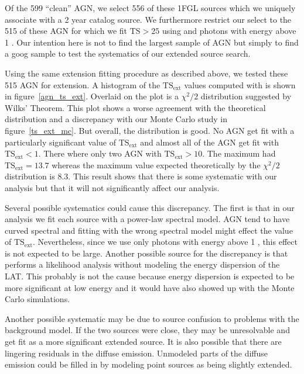 \documentclass[12pt,preprint]{aastex}
\newcommand{\gev}{\text{GeV}\xspace}
\newcommand{\tsext}{{\ensuremath{\text{TS}_\text{ext}}}\xspace}
\newcommand{\ts}{\text{TS}\xspace}
\newcommand{\pointlike}{\text{\em pointlike}\xspace}
\begin{document}
Of the 599 ``clean'' AGN, we select 556 of these 1FGL sources which
we uniquely associate with a 2 year catalog source. We furthermore
restrict our select to the 515 of these AGN for which we fit $\ts>25$
using \pointlike and photons with energy above 1 \gev.  Our intention
here is not to find the largest sample of AGN but simply
to find a goog sample to test the systematics of our extended source
search.

Using the same extension fitting procedure as described above, we tested
these 515 AGN for extension. A histogram of the \tsext values computed
with \pointlike is shown in figure~\ref{agn_ts_ext}. Overlaid on the plot
is a $\chi^2/2$ distribution suggested by Wilks' Theorem.  This plot
shows a worse agreement with the theoretical distribution and
a discrepancy with 
our Monte Carlo study in figure~\ref{ts_ext_mc}.  But overall, the
distribution is good. No AGN get fit with a particularly significant
value of $\tsext$ and almost all of the AGN get fit with $\tsext<1$.
There where only two AGN with $\tsext>10$. The maximum had $\tsext=13.7$
whereas the maximum value expected theoretically by the $\chi^2/2$ distribution is
8.3. This result shows that there is some systematic with our
analysis but that it will not significantly affect our analysis.

Several possible systematics could cause this discrepancy. The first is
that in our analysis we fit each source with a power-law spectral model.
AGN tend to have curved spectral and fitting with the wrong spectral
model might effect the value of \tsext. Nevertheless, since we use only
photons with energy above 1 \gev, this effect is not expected to be large.
Another possible source for the discrepancy is that \pointlike performs
a likelihood analysis without modeling the energy dispersion of the LAT.
This probably is not the cause because energy dispersion is expected to
be more significant at low energy and it would have also showed up with
the Monte Carlo simulations.

Another possible systematic may be due to source confusion to problems
with the background model. If the two sources were close,
they may be unresolvable and get fit as a more significant extended source.
It is also possible that there are lingering
residuals in the diffuse emission. Unmodeled parts of the diffuse
emission could be filled in by modeling point sources as being slightly extended.
\end{document}
